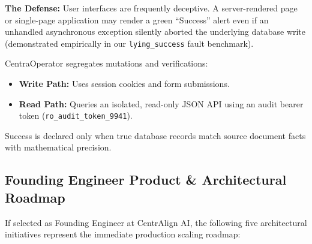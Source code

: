 \begin{qaquerybox}
\textbf{The Defense:}
User interfaces are frequently deceptive. A server-rendered page or single-page application may render a green ``Success'' alert even if an unhandled asynchronous exception silently aborted the underlying database write (demonstrated empirically in our \texttt{lying\_success} fault benchmark).

CentraOperator segregates mutations and verifications:
\begin{itemize}
  \item \textbf{Write Path:} Uses session cookies and form submissions.
  \item \textbf{Read Path:} Queries an isolated, read-only JSON API using an audit bearer token (\texttt{ro\_audit\_token\_9941}).
\end{itemize}
Success is declared only when true database records match source document facts with mathematical precision.
\end{qaquerybox}

\subsection{Founding Engineer Product \& Architectural Roadmap}
If selected as Founding Engineer at CentrAlign AI, the following five architectural initiatives represent the immediate production scaling roadmap:

